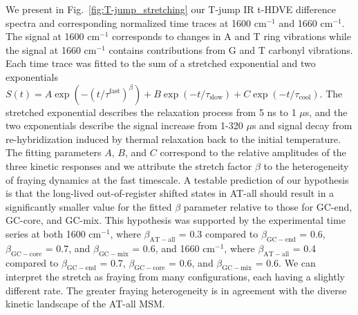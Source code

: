 \documentclass[journal=jpcbfk,manuscript=article]{achemso}
\begin{document}
We present in Fig.~\ref{fig:T-jump_stretching} our T-jump IR t-HDVE difference spectra and corresponding normalized time traces at 1600 cm$^{-1}$ and 1660 cm$^{-1}$. The signal at 1600 cm$^{-1}$ corresponds to changes in A and T ring vibrations while the signal at 1660 cm$^{-1}$ contains contributions from G and T carbonyl vibrations. Each time trace was fitted to the sum of a stretched exponential and two exponentials $S(t) = A\exp{(-(t/\tau^{\mathrm{fast}})^{\beta})} + B\exp{(-t/\tau_{\mathrm{slow}})}+C\exp{(-t/\tau_{\mathrm{cool}})}$. The stretched exponential describes the relaxation process from 5 ns to 1 $\mu$s, and the two exponentials describe the signal increase from 1-320 $\mu$s and signal decay from re-hybridization induced by thermal relaxation back to the initial temperature. The fitting parameters $A$, $B$, and $C$ correspond to the relative amplitudes of the three kinetic responses and we attribute the stretch factor $\beta$ to the heterogeneity of fraying dynamics at the fast timescale. A testable prediction of our hypothesis is that the long-lived out-of-register shifted states in AT-all should result in a significantly smaller value for the fitted $\beta$ parameter relative to those for GC-end, GC-core, and GC-mix. This hypothesis was supported by the experimental time series at both 1600 cm$^{-1}$, where $\beta_\mathrm{AT-all}$ = 0.3 compared to $\beta_\mathrm{GC-end}$ = 0.6, $\beta_\mathrm{GC-core}$ = 0.7, and $\beta_\mathrm{GC-mix}$ = 0.6, and 1660 cm$^{-1}$, where $\beta_\mathrm{AT-all}$ = 0.4 compared to $\beta_\mathrm{GC-end}$ = 0.7, $\beta_\mathrm{GC-core}$ = 0.6, and $\beta_\mathrm{GC-mix}$ = 0.6. We can interpret the stretch as fraying from many configurations, each having a slightly different rate. The greater fraying heterogeneity is in agreement with the diverse kinetic landscape of the AT-all MSM. 

\end{document}
